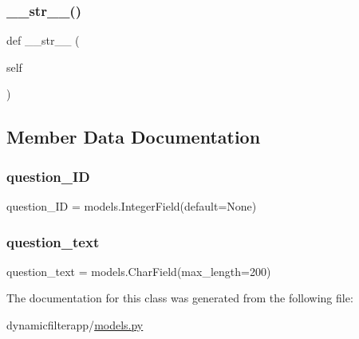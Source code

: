 \subsubsection{\texorpdfstring{\_\_str\_\_()}{\_\_str\_\_()}}
{\footnotesize\ttfamily def \+\_\+\+\_\+str\+\_\+\+\_\+ (\begin{DoxyParamCaption}\item[{}]{self }\end{DoxyParamCaption})}



\subsection{Member Data Documentation}
\mbox{\label{classdynamicfilterapp_1_1models_1_1_question_a4614954525e0499e3e5ae2de1f277ac8}} 
\subsubsection{\texorpdfstring{question\_ID}{question\_ID}}
{\footnotesize\ttfamily question\+\_\+\+ID = models.\+Integer\+Field(default=None)\hspace{0.3cm}{\ttfamily [static]}}

\mbox{\label{classdynamicfilterapp_1_1models_1_1_question_a200d22e5ef377c5e3799614d9f9730f8}} 
\subsubsection{\texorpdfstring{question\_text}{question\_text}}
{\footnotesize\ttfamily question\+\_\+text = models.\+Char\+Field(max\+\_\+length=200)\hspace{0.3cm}{\ttfamily [static]}}



The documentation for this class was generated from the following file\+:\begin{DoxyCompactItemize}
\item 
dynamicfilterapp/\mbox{\hyperlink{models_8py}{models.\+py}}\end{DoxyCompactItemize}
